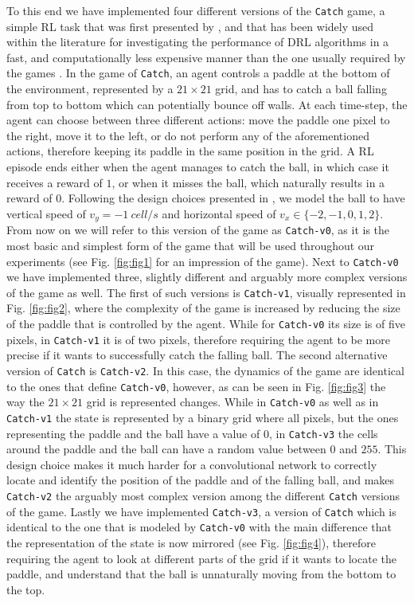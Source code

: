 To this end we have implemented four different versions of the \texttt{Catch} game, a simple RL task that was first presented by \citet{mnih2014recurrent}, and that has been widely used within the literature for investigating the performance of DRL algorithms in a fast, and computationally less expensive manner than the one usually required by the  games \cite{vanjos2018deep, aittahar2020empirical}. In the game of \texttt{Catch}, an agent controls a paddle at the bottom of the environment, represented by a $21 \times 21$ grid, and has to catch a ball falling from top to bottom which can potentially bounce off walls. At each time-step, the agent can choose between three different actions: move the paddle one pixel to the right, move it to the left, or do not perform any of the aforementioned actions, therefore keeping its paddle in the same position in the grid. A RL episode ends either when the agent manages to catch the ball, in which case it receives a reward of $1$, or when it misses the ball, which naturally results in a reward of $0$. Following the design choices presented in \cite{vanjos2017deep}, we model the ball to have vertical speed of $v_y=-1 \: cell/s$ and horizontal speed of $v_x \in \{-2,-1,0,1,2\}$. From now on we will refer to this version of the game as \texttt{Catch-v0}, as it is the most basic and simplest form of the game that will be used throughout our experiments (see Fig. \ref{fig:fig1} for an impression of the game). Next to \texttt{Catch-v0} we have implemented three, slightly different and arguably more complex versions of the game as well. The first of such versions is \texttt{Catch-v1}, visually represented in Fig. \ref{fig:fig2}, where the complexity of the game is increased by reducing the size of the paddle that is controlled by the agent. While for \texttt{Catch-v0} its size is of five pixels, in \texttt{Catch-v1} it is of two pixels, therefore requiring the agent to be more precise if it wants to successfully catch the falling ball. The second alternative version of \texttt{Catch} is \texttt{Catch-v2}. In this case, the dynamics of the game are identical to the ones that define \texttt{Catch-v0}, however, as can be seen in Fig. \ref{fig:fig3} the way the $21 \times 21$ grid is represented changes. While in \texttt{Catch-v0} as well as in \texttt{Catch-v1} the state is represented by a binary grid where all pixels, but the ones representing the paddle and the ball have a value of $0$, in \texttt{Catch-v3} the cells around the paddle and the ball can have a random value between $0$ and $255$. This design choice makes it much harder for a convolutional network to correctly locate and identify the position of the paddle and of the falling ball, and makes \texttt{Catch-v2} the arguably most complex version among the different \texttt{Catch} versions of the game. Lastly we have implemented \texttt{Catch-v3}, a version of \texttt{Catch} which is identical to the one that is modeled by \texttt{Catch-v0} with the main difference that the representation of the state is now mirrored (see Fig. \ref{fig:fig4}), therefore requiring the agent to look at different parts of the grid if it wants to locate the paddle, and understand that the ball is unnaturally moving from the bottom to the top.  

